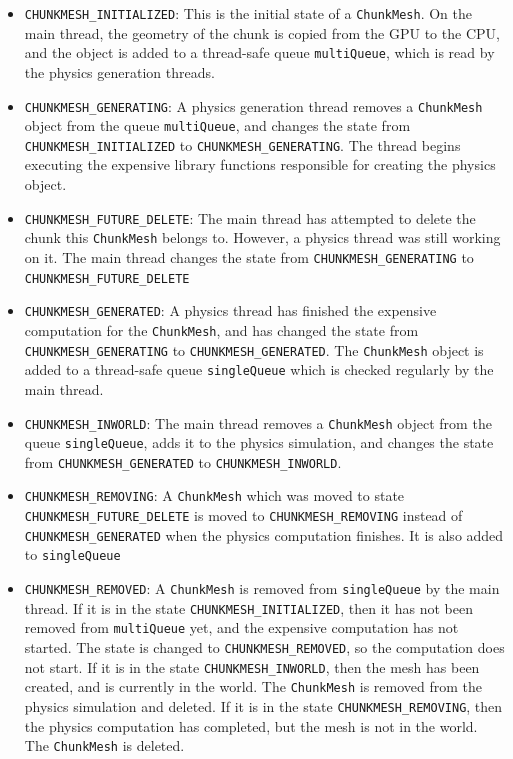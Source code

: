 \documentclass{article}
\begin{document}
\begin{itemize}
 \item \texttt{CHUNKMESH\_INITIALIZED}: This is the initial state of a \texttt{ChunkMesh}. On the main thread, the geometry of the chunk is copied from the GPU to the CPU, and the object is added to a thread-safe queue \texttt{multiQueue}, which is read by the physics generation threads.
 \item \texttt{CHUNKMESH\_GENERATING}: A physics generation thread removes a \texttt{ChunkMesh} object from the queue \texttt{multiQueue}, and changes the state from \texttt{CHUNKMESH\_INITIALIZED} to \texttt{CHUNKMESH\_GENERATING}. The thread begins executing the expensive library functions responsible for creating the physics object.
 \item \texttt{CHUNKMESH\_FUTURE\_DELETE}: The main thread has attempted to delete the chunk this \texttt{ChunkMesh} belongs to. However, a physics thread was still working on it. The main thread changes the state from \texttt{CHUNKMESH\_GENERATING} to \texttt{CHUNKMESH\_FUTURE\_DELETE}
 \item \texttt{CHUNKMESH\_GENERATED}: A physics thread has finished the expensive computation for the \texttt{ChunkMesh}, and has changed the state from \texttt{CHUNKMESH\_GENERATING} to \texttt{CHUNKMESH\_GENERATED}. The \texttt{ChunkMesh} object is added to a thread-safe queue \texttt{singleQueue} which is checked regularly by the main thread.
 \item \texttt{CHUNKMESH\_INWORLD}: The main thread removes a \texttt{ChunkMesh} object from the queue \texttt{singleQueue}, adds it to the physics simulation, and changes the state from \texttt{CHUNKMESH\_GENERATED} to \texttt{CHUNKMESH\_INWORLD}.
 \item \texttt{CHUNKMESH\_REMOVING}: A \texttt{ChunkMesh} which was moved to state \texttt{CHUNKMESH\_FUTURE\_DELETE} is moved to \texttt{CHUNKMESH\_REMOVING} instead of \texttt{CHUNKMESH\_GENERATED} when the physics computation finishes. It is also added to \texttt{singleQueue}
 \item \texttt{CHUNKMESH\_REMOVED}: A \texttt{ChunkMesh} is removed from \texttt{singleQueue} by the main thread. If it is in the state \texttt{CHUNKMESH\_INITIALIZED}, then it has not been removed from \texttt{multiQueue} yet, and the expensive computation has not started. The state is changed to \texttt{CHUNKMESH\_REMOVED}, so the computation does not start. If it is in the state \texttt{CHUNKMESH\_INWORLD}, then the mesh has been created, and is currently in the world. The \texttt{ChunkMesh} is removed from the physics simulation and deleted. If it is in the state \texttt{CHUNKMESH\_REMOVING}, then the physics computation has completed, but the mesh is not in the world. The \texttt{ChunkMesh} is deleted.
\end{itemize}
\end{document}
